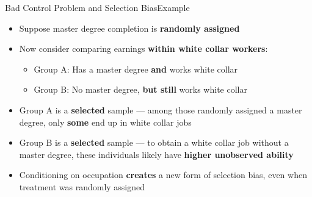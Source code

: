\documentclass[dvipsnames,hyperref={pdfpagelabels=false}]{beamer}
\begin{document}
\begin{frame}{Bad Control Problem and Selection Bias}{Example}
	\begin{itemize} 
		\item Suppose master degree completion is \textbf{randomly assigned}
		\vspace{0.2cm}
		\item Now consider comparing earnings \textbf{within white collar workers}:
		\vspace{0.2cm}
		\begin{itemize} 
			\item Group A: Has a master degree \textbf{and} works white collar
			\vspace{0.2cm}
			\item Group B: No master degree, \textbf{but still} works white collar
			\vspace{0.2cm}
		\end{itemize}
			\item Group A is a \textbf{selected} sample --- among those randomly assigned a master degree, only \textbf{some} end up in white collar jobs
		\vspace{0.2cm}
        \item Group B is a \textbf{selected} sample --- to obtain a white collar job without a master degree, these individuals likely have \textbf{higher unobserved ability}
		\vspace{0.2cm}
		\item Conditioning on occupation \textbf{creates} a new form of selection bias, even when treatment was randomly assigned
	\end{itemize}
\end{frame}
\end{document}
